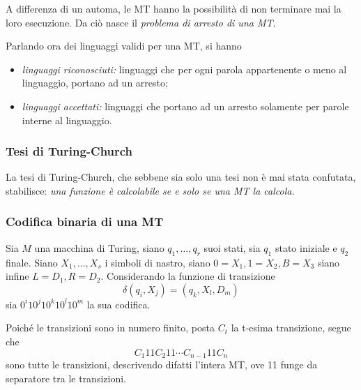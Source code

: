 \documentclass{subfiles}
\begin{document}
A differenza di un automa, le MT hanno la possibilità di non terminare mai la loro esecuzione.
Da ciò nasce il \emph{problema di arresto di una MT}.

\noindent Parlando ora dei linguaggi validi per una MT, si hanno
\begin{itemize}
    \item \emph{linguaggi riconosciuti:} linguaggi che per ogni parola appartenente o meno al linguaggio, portano ad un arresto;
    \item \emph{linguaggi accettati:} linguaggi che portano ad un arresto solamente per parole interne al linguaggio.
\end{itemize}

\subsubsection{Tesi di Turing-Church}
La tesi di Turing-Church, che sebbene sia solo una tesi non è mai stata confutata, stabilisce: \emph{una funzione è calcolabile se e solo se una MT la calcola.}

\subsubsection{Codifica binaria di una MT}
Sia \(M\) una macchina di Turing, siano \(q_{1}, \ldots, q_{r}\) suoi stati, sia \(q_{1}\) stato iniziale e \(q_{2}\) finale.
Siano \(X_{1}, \ldots, X_{s}\) i simboli di nastro, siano \(0 = X_{1}, 1 = X_{2}, B = X_{3}\) siano infine \(L = D_{1}, R = D_{2}\).
Considerando la funzione di transizione
\[
    \delta(q_{i}, X_{j}) = (q_{k}, X_{l}, D_{m})
\]
sia \(0^{i}10^{j}10^{k}10^{l}10^{m}\) la sua codifica.

\noindent Poiché le transizioni sono in numero finito, posta \(C_{t}\) la t-esima transizione, segue che
\[
    C_{1}11C_{2}11 \cdots C_{n - 1} 11 C_{n}
\]
sono tutte le transizioni, descrivendo difatti l'intera MT, ove 11 funge da separatore tra le transizioni.
\end{document}
